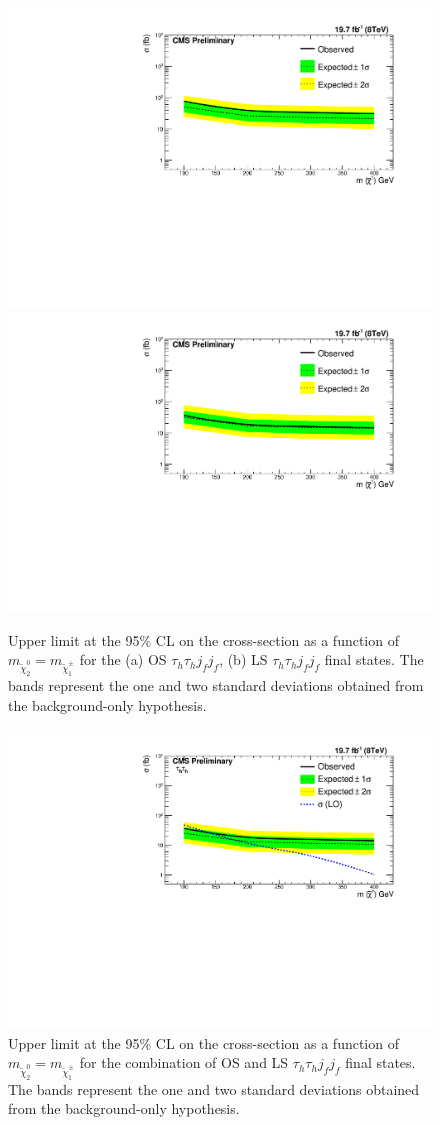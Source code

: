 \begin{figure}
	\begin{center}
		\includegraphics[angle=0,width=.48\textwidth, height=0.35\textheight]{PLOTS/Limit_VBF_diTau_OS.pdf}
		\includegraphics[angle=0,width=.48\textwidth, height=0.35\textheight]{PLOTS/Limit_VBF_diTau_LS.pdf}
		\caption{Upper limit at the 95\% CL on the cross-section as a function of 
			$m_{\tilde{\chi}_{2}^{0}}=m_{\tilde{\chi}_{1}^{\pm}}$ for the (a) OS 
			$\tau_{h}\tau_{h} j_{f} j_{f}$, (b) LS $\tau_{h}\tau_{h} j_{f} j_{f}$
			final states. The bands represent the one and two standard deviations obtained from the background-only hypothesis.}
		\label{fig:LimitsOSLS}
	\end{center}
\end{figure}

\begin{figure}
	\begin{center}
		\includegraphics[angle=0,scale=0.75]{PLOTS/Limit_VBF_diTau_combined.pdf}
		\caption{Upper limit at the 95\% CL on the cross-section as a function of 
			$m_{\tilde{\chi}_{2}^{0}}=m_{\tilde{\chi}_{1}^{\pm}}$ for the combination of OS and LS $\tau_{h}\tau_{h} j_{f} j_{f}$
			final states. The bands represent the one and two standard deviations obtained from the background-only hypothesis.}
		\label{fig:LimitsCombination}
	\end{center}
\end{figure}

